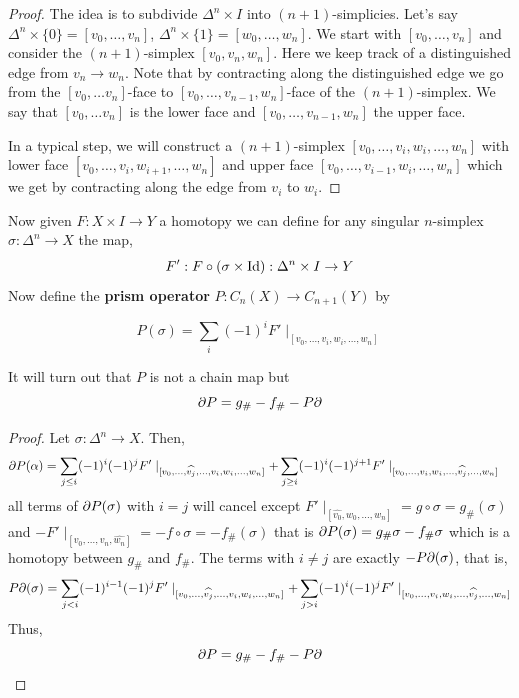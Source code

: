 \documentclass[12pt]{amsart}
\begin{document}
\begin{proof}
    The idea is to subdivide $\Delta^n \times I $ into $(n+1)$-simplicies. Let's say $\Delta^n \times \{0\} = [v_0, \ldots, v_n]$, $\Delta^n \times \{1\} = [w_0, \ldots, w_n]$. We start with $[v_0, \ldots, v_n]$ and consider the $(n+1)$-simplex $[v_0, v_n, w_n]$. Here we keep track of a distinguished edge from $v_n \to w_n$. Note that by contracting along the distinguished edge we go from the $[v_0, \ldots v_n]$-face to $[v_0, \ldots, v_{n-1}, w_n]$-face of the $(n+1)$-simplex. We say that $[v_0, \ldots v_n]$ is the lower face and $[v_0, \ldots, v_{n-1}, w_n]$ the upper face. 

    In a typical step, we will construct a $(n+1)$-simplex $[v_0, \ldots, v_i, w_i, \ldots, w_n]$ with lower face $[v_0, \ldots, v_i, w_{i+1}, \ldots, w_n]$ and upper face  $[v_0, \ldots, v_{i-1}, w_i, \ldots, w_n]$ which we get by contracting along the edge from $v_i$ to $w_i$. 
\end{proof}

\begin{proposition}
     Now given $F: X \times I \to Y$  a homotopy we can define for any singular $n$-simplex $\sigma: \Delta^n \to X$ the map, 
    \[F': F \circ (\sigma \times \operatorname{Id}) : \Delta^n \times I \to Y\] 
    Now define the \textbf{prism operator} $P: C_n(X) \to C_{n+1}(Y)$ by 

    \[P(\sigma) = \sum_i(-1)^i F' \mid_{[v_0, \ldots, v_i, w_i, \ldots, w_n]}\]

    It will turn out that $P$ is not a chain map but 
    \[\partial P = g_{\#} - f_{\#} - P \partial\]
\end{proposition}

\begin{proof}
    Let $\sigma: \Delta^n \to X$. Then, 
    \begin{align*}
        \partial P(\alpha) &= \sum_{j \leq i} (-1)^i(-1)^j F' \mid_{[v_0, \ldots, \widehat{v_j}, \ldots, v_i, w_i, \ldots, w_n]} + \sum_{j \geq i} (-1)^i(-1)^{j+1} F' \mid_{[v_0, \ldots, v_i, w_i, \ldots, \widehat{v_j},\ldots, w_n]}
    \end{align*} 
    all terms of $\partial P (\sigma)$ with $i=j$ will cancel except $F' \mid_{[ \widehat{v_0}, w_0, \ldots, w_n]} = g \circ \sigma = g_{\#}(\sigma)$ and $-F' \mid_{[v_0, \ldots, v_n, \widehat{w_n}]} = - f \circ \sigma = -f_{\#}(\sigma)$ that is $\partial P(\sigma) = g_{\#} \sigma - f_{\#} \sigma$ which is a homotopy between $g_{\#}$ and $f_{\#}$. 
    The terms with $i \neq j$ are exactly $-P \partial(\sigma)$, that is, 
    \[P \partial (\sigma) = \sum_{j < i} (-1)^{i-1}(-1)^j F' \mid_{[v_0, \ldots, \widehat{v_j}, \ldots, v_i, w_i, \ldots, w_n]} + \sum_{j > i} (-1)^i(-1)^{j} F' \mid_{[v_0, \ldots, v_i, w_i, \ldots, \widehat{v_j},\ldots, w_n]}\]
    Thus, 
    \[\partial P = g_{\#} - f_{\#} - P \partial\]

\end{proof}
\end{document}
